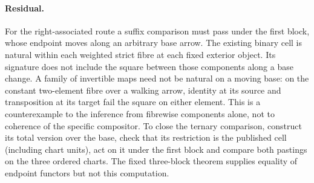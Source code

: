 \documentclass{article}
\begin{document}
\paragraph{Residual.} For the right-associated route a suffix comparison
must pass under the first block, whose endpoint moves along an arbitrary
base arrow. The existing binary cell is natural within each weighted strict
fibre at each fixed exterior object. Its signature does not include the
square between those components along a base change. A family of invertible
maps need not be natural on a moving base: on the constant two-element
fibre over a walking arrow, identity at its source and transposition at its
target fail the square on either element. This is a counterexample to the
inference from fibrewise components alone, not to coherence of the specific
compositor. To close the ternary comparison, construct its total version
over the base, check that its restriction is the published cell (including
chart units), act on it under the first block and compare both pastings on
the three ordered charts. The fixed three-block theorem supplies equality
of endpoint functors but not this computation.
\end{document}
